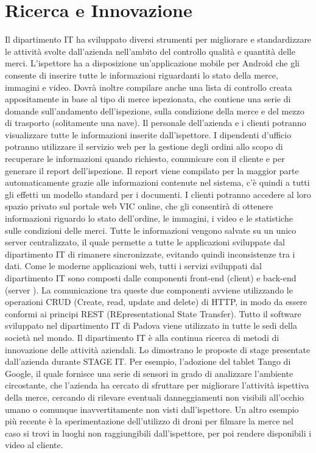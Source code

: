 \section{Ricerca e Innovazione} %
	Il dipartimento IT ha sviluppato diversi strumenti per migliorare e standardizzare le
	attività svolte dall’azienda nell’ambito del controllo qualità e quantità delle merci.
	L’ispettore ha a disposizione un’applicazione mobile per Android che gli consente di
	inserire tutte le informazioni riguardanti lo stato della merce, immagini e video. Dovrà
	inoltre compilare anche una lista di controllo creata appositamente in base al tipo di
	merce ispezionata, che contiene una serie di domande sull’andamento dell’ispezione,
	sulla condizione della merce e del mezzo di trasporto (solitamente una nave).
	Il personale dell’azienda e i clienti potranno visualizzare tutte le informazioni inserite
	dall’ispettore. I dipendenti d’ufficio potranno utilizzare il servizio web per la gestione
	degli ordini allo scopo di recuperare le informazioni quando richiesto, comunicare con il
	cliente e per generare il report dell’ispezione. Il report viene compilato per la maggior
	parte automaticamente grazie alle informazioni contenute nel sistema, c’è quindi a
	tutti gli effetti un modello standard per i documenti.
	I clienti potranno accedere al loro spazio privato sul portale web VIC online, che gli
	consentirà di ottenere informazioni riguardo lo stato dell’ordine, le immagini, i video e
	le statistiche sulle condizioni delle merci.
	Tutte le informazioni vengono salvate su un unico server centralizzato, il quale permette
	a tutte le applicazioni sviluppate dal dipartimento IT di rimanere sincronizzate,
	evitando quindi inconsistenze tra i dati.
	Come le moderne applicazioni web, tutti i servizi sviluppati dal dipartimento IT sono
	composti dalle componenti front-end (client) e back-end (server ). La comunicazione tra
	queste due componenti avviene utilizzando le operazioni CRUD (Create, read, update
	and delete) di HTTP, in modo da essere conformi ai principi REST (REpresentational
	State Transfer).
	Tutto il software sviluppato nel dipartimento IT di Padova viene utilizzato in tutte le
	sedi della società nel mondo.
	Il dipartimento IT è alla continua ricerca di metodi di innovazione delle attività
	aziendali. Lo dimostrano le proposte di stage presentate dall’azienda durante STAGE
	IT. Per esempio, l’adozione del tablet Tango di Google, il quale fornisce una serie
	di sensori in grado di analizzare l’ambiente circostante, che l’azienda ha cercato di
	sfruttare per migliorare l’attività ispettiva della merce, cercando di rilevare eventuali
	danneggiamenti non visibili all’occhio umano o comunque inavvertitamente non visti
	dall’ispettore. Un altro esempio più recente è la sperimentazione dell’utilizzo di droni
	per filmare la merce nel caso si trovi in luoghi non raggiungibili dall’ispettore, per poi
	rendere disponibili i video al cliente.

